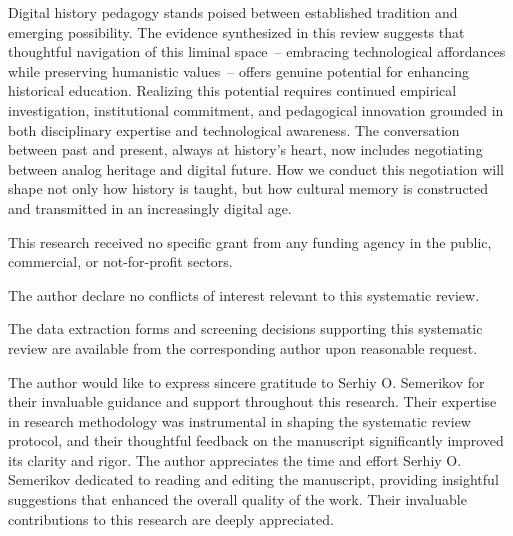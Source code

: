 \documentclass[
hf,
]{ceurart}
\begin{document}
Digital history pedagogy stands poised between established tradition and emerging possibility. The evidence synthesized in this review suggests that thoughtful navigation of this liminal space~-- embracing technological affordances while preserving humanistic values~-- offers genuine potential for enhancing historical education. Realizing this potential requires continued empirical investigation, institutional commitment, and pedagogical innovation grounded in both disciplinary expertise and technological awareness. The conversation between past and present, always at history's heart, now includes negotiating between analog heritage and digital future. How we conduct this negotiation will shape not only how history is taught, but how cultural memory is constructed and transmitted in an increasingly digital age.


\begin{funding}
This research received no specific grant from any funding agency in the public, commercial, or not-for-profit sectors.
\end{funding}

\begin{conflictsofinterest}
The author declare no conflicts of interest relevant to this systematic review.
\end{conflictsofinterest}



\begin{dataavailability}
The data extraction forms and screening decisions supporting this systematic review are available from the corresponding author upon reasonable request.
\end{dataavailability}


\begin{acknowledgments}
The author would like to express sincere gratitude to Serhiy O. Semerikov for their invaluable guidance and support throughout this research. Their expertise in research methodology was instrumental in shaping the systematic review protocol, and their thoughtful feedback on the manuscript significantly improved its clarity and rigor. The author appreciates the time and effort Serhiy O. Semerikov dedicated to reading and editing the manuscript, providing insightful suggestions that enhanced the overall quality of the work. Their invaluable contributions to this research are deeply appreciated.
\end{acknowledgments}
\end{document}
